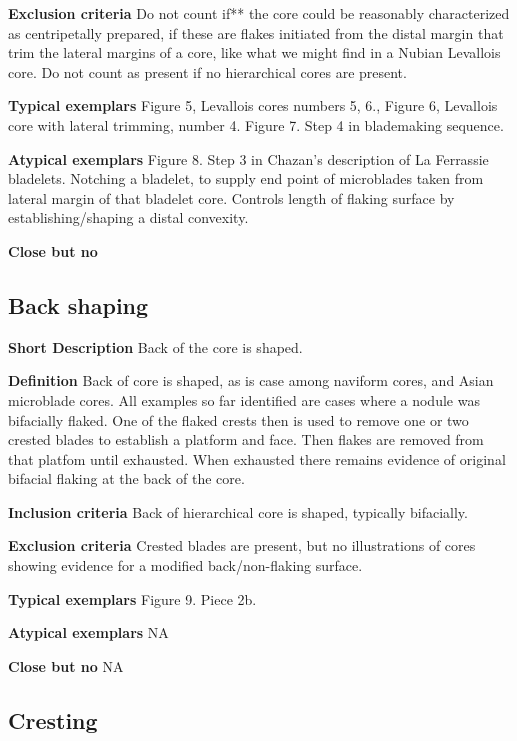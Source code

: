 \documentclass[
]{article}
\begin{document}
\textbf{Exclusion criteria} Do not count if** the core could be
reasonably characterized as centripetally prepared, if these are flakes
initiated from the distal margin that trim the lateral margins of a
core, like what we might find in a Nubian Levallois core. Do not count
as present if no hierarchical cores are present.

\textbf{Typical exemplars} Figure 5, Levallois cores numbers 5, 6.,
Figure 6, Levallois core with lateral trimming, number 4. Figure 7. Step
4 in blademaking sequence.

\textbf{Atypical exemplars} Figure 8. Step 3 in Chazan's description of
La Ferrassie bladelets. Notching a bladelet, to supply end point of
microblades taken from lateral margin of that bladelet core. Controls
length of flaking surface by establishing/shaping a distal convexity.

\textbf{Close but no}

\hypertarget{back-shaping}{%
\subsection{Back shaping}\label{back-shaping}}

\textbf{Short Description} Back of the core is shaped.

\textbf{Definition} Back of core is shaped, as is case among naviform
cores, and Asian microblade cores. All examples so far identified are
cases where a nodule was bifacially flaked. One of the flaked crests
then is used to remove one or two crested blades to establish a platform
and face. Then flakes are removed from that platfom until exhausted.
When exhausted there remains evidence of original bifacial flaking at
the back of the core.

\textbf{Inclusion criteria} Back of hierarchical core is shaped,
typically bifacially.

\textbf{Exclusion criteria} Crested blades are present, but no
illustrations of cores showing evidence for a modified back/non-flaking
surface.

\textbf{Typical exemplars} Figure 9. Piece 2b.

\textbf{Atypical exemplars} NA

\textbf{Close but no} NA

\hypertarget{cresting}{%
\subsection{Cresting}\label{cresting}}
\end{document}
